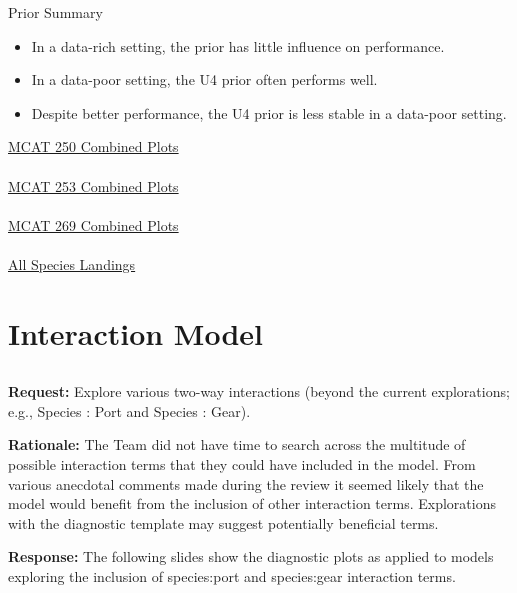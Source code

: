 \documentclass[ xcolor = pdftex, dvipsnames, table ]{beamer}
\begin{document}
%
\begin{frame}{Prior Summary}	
        \begin{minipage}{0.49\textwidth}
	\begin{itemize}
	\item In a data-rich setting, the prior has little influence on performance. 
	\item In a data-poor setting, the U4 prior often performs well.
	\item Despite better performance, the U4 prior is less stable in a data-poor setting. 
	\end{itemize}
	\end{minipage}
        \begin{minipage}{0.49\textwidth}
	\begin{center}
	\href{https://github.com/gasduster99/sppComp/tree/master/try1/postSSC/25019781982M4HC1HC3U4}{MCAT 250 Combined Plots}\\$~$\\
	\href{https://github.com/gasduster99/sppComp/tree/master/try1/postSSC/25319781982M4HC1HC3U4}{MCAT 253 Combined Plots}\\$~$\\
	\href{https://github.com/gasduster99/sppComp/tree/master/try1/postSSC/26919781982M4HC1HC3U4}{MCAT 269 Combined Plots}\\$~$\\
	\href{https://github.com/gasduster99/sppComp/tree/master/try1/postSSC/landDiagnostics/M4IGHC1HC3U4}{All Species Landings}
	\end{center}
	\end{minipage}
\end{frame}

%
%

%
\section{Interaction Model}
\subsection{}
\begin{frame}
\textbf{Request:}
Explore various two-way interactions (beyond the current explorations; e.g., 
Species : Port and Species : Gear). 

\textbf{Rationale:}  
The Team did not have time to search across the multitude of possible 
interaction terms that they could have included in the model.  From various 
anecdotal comments made during the review it seemed likely that the model 
would benefit from the inclusion of other interaction terms.  Explorations 
with the diagnostic template may suggest potentially beneficial terms.

\textbf{Response:}
The following slides show the diagnostic plots as applied to models exploring 
the inclusion of species:port and species:gear interaction terms.

\end{frame}
\end{document}
